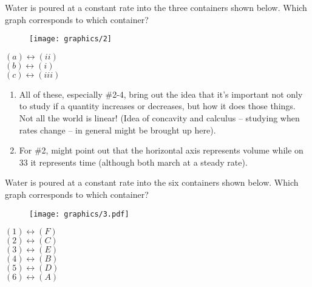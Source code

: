 \documentclass{ximera}
\begin{document}
\begin{problem}
Water is poured at a constant rate into the three containers shown
below. Which graph corresponds to which container?

\begin{figure}[h]
\begin{center}
\texttt{[image: graphics/2]}
\end{center}
\end{figure}

\begin{solution}
    $(a) \leftrightarrow (ii)$ \\
    $(b) \leftrightarrow (i)$\\
    $(c) \leftrightarrow (iii)$
\end{solution}

\begin{instructorNotes}
\begin{enumerate}
    \item All of these, especially \#2-4, bring out the idea that it's important not only to study if a quantity increases or decreases, but how it does those things.  Not all the world is linear! (Idea of concavity and calculus – studying when rates change – in general might be brought up here).
    \item For \#2, might point out that the horizontal axis represents volume while on 33 it represents time (although both march at a steady rate).
\end{enumerate}
\end{instructorNotes}
\end{problem}

\newpage

\begin{problem}
Water is poured at a constant rate into the six containers shown
below. Which graph corresponds to which container?

\begin{figure}[h]
\begin{center}
\texttt{[image: graphics/3.pdf]}
\end{center}
\end{figure}

\begin{solution}
    $(1) \leftrightarrow (F)$\\
    $(2) \leftrightarrow (C)$\\
    $(3) \leftrightarrow (E)$\\
    $(4) \leftrightarrow (B)$\\
    $(5) \leftrightarrow (D)$\\
    $(6) \leftrightarrow (A)$
\end{solution}

\end{problem}
\end{document}
